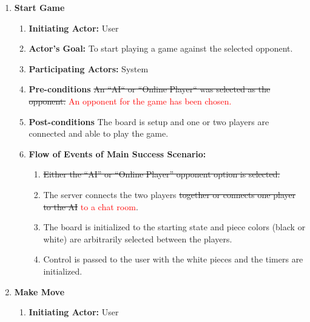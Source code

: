 \documentclass[12pt, titlepage]{article}
\begin{document}
\begin{enumerate}[{UC}1.]
                \item \textbf{Start Game}
                    \begin{enumerate}[{ }]
                        \item \textbf{Initiating Actor:} 
                            User
            
                        \item \textbf{Actor's Goal:} 
                            To start playing a game against the selected opponent.
                        
                        \item \textbf{Participating Actors:} 
                            System
                        
                        \item \textbf{Pre-conditions}
                            \sout{An ``AI`` or ``Online Player`` was selected as the opponent.} \textcolor{red}{An opponent for the game has been chosen.}
                            
                        \item \textbf{Post-conditions}
                            The board is setup and one or two players are connected and able to play the game.
                            
                        \item \textbf{Flow of Events of Main Success Scenario:}
                           \begin{enumerate}
                                \item \sout{Either the ``AI'' or ``Online Player'' opponent option is selected.}
                                \item The server connects the two players \sout{together or connects one player to the AI} \textcolor{red}{to a chat room}.
                                \item The board is initialized to the starting state and piece colors (black or white) are arbitrarily selected between the players.
                                \item Control is passed to the user with the white pieces and the timers are initialized.
                            \end{enumerate}
                    \end{enumerate}
                    
                \item \textbf{Make Move}
                    \begin{enumerate}[{ }]
                        \item \textbf{Initiating Actor:} 
                            User
            

\end{enumerate}
\end{enumerate}
\end{document}
